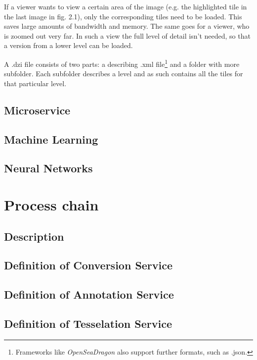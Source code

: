 If a viewer wants to view a certain area of the image (e.g. the highlighted tile in the last image in fig. 2.1), only the corresponding tiles need to be loaded. This saves large amounts of bandwidth and memory. The same goes for a viewer, who is zoomed out very far. In such a view the full level of detail isn't needed, so that a version from a lower level can be loaded.

A .dzi file consists of two parts: a describing .xml file\footnote{Frameworks like \emph{OpenSeaDragon} also support further formats, such as .json.} and a folder with more subfolder. Each subfolder describes a level and as such contains all the tiles for that particular level.



\subsection{Microservice}
\subsection{Machine Learning}
\subsection{Neural Networks}
\section{Process chain}
\subsection{Description}
\subsection{Definition of Conversion Service}
\subsection{Definition of Annotation Service}
\subsection{Definition of Tesselation Service}